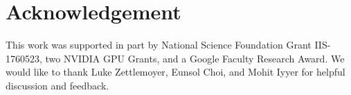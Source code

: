 

\section*{Acknowledgement}
This work was supported in part by National Science Foundation Grant IIS-1760523, two NVIDIA GPU Grants, and a Google Faculty Research Award. We would like to thank Luke Zettlemoyer, Eunsol Choi, and Mohit Iyyer for helpful discussion and feedback.
